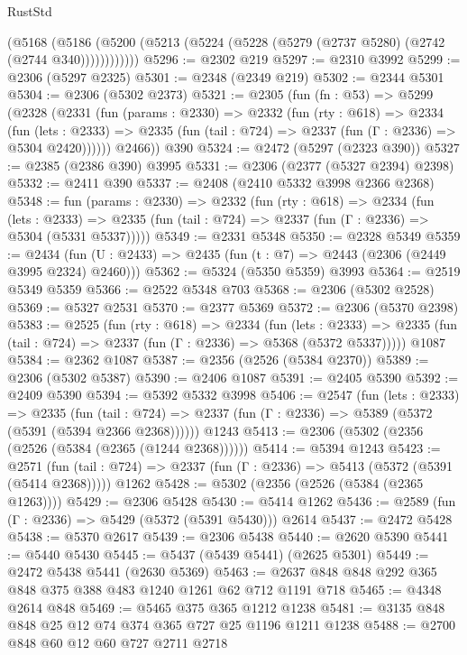 \begin{lexlean}{RustStd}
\begin{coremodule}
          (@5168
            (@5186 (@5200 (@5213 (@5224 (@5228 (@5279 (@2737 @5280) (@2742 (@2744 @340))))))))))))
@5296 := @2302 @219
@5297 := @2310 @3992
@5299 := @2306 (@5297 @2325)
@5301 := @2348 (@2349 @219)
@5302 := @2344 @5301
@5304 := @2306 (@5302 @2373)
@5321 := @2305
    (fun (fn : @53) =>
    @5299
      (@2328
        (@2331
          (fun (params : @2330) =>
          @2332
            (fun (rty : @618) =>
            @2334
              (fun (lets : @2333) =>
              @2335 (fun (tail : @724) => @2337 (fun (Γ : @2336) => @5304 @2420))))))
        @2466))
    @390
@5324 := @2472 (@5297 (@2323 @390))
@5327 := @2385 (@2386 @390) @3995
@5331 := @2306 (@2377 (@5327 @2394) @2398)
@5332 := @2411 @390
@5337 := @2408 (@2410 @5332 @3998 @2366 @2368)
@5348 := fun (params : @2330) =>
  @2332
    (fun (rty : @618) =>
    @2334
      (fun (lets : @2333) =>
      @2335 (fun (tail : @724) => @2337 (fun (Γ : @2336) => @5304 (@5331 @5337)))))
@5349 := @2331 @5348
@5350 := @2328 @5349
@5359 := @2434 (fun (U : @2433) => @2435 (fun (t : @7) => @2443 (@2306 (@2449 @3995 @2324) @2460)))
@5362 := @5324 (@5350 @5359) @3993
@5364 := @2519 @5349 @5359
@5366 := @2522 @5348 @703
@5368 := @2306 (@5302 @2528)
@5369 := @5327 @2531
@5370 := @2377 @5369
@5372 := @2306 (@5370 @2398)
@5383 := @2525
    (fun (rty : @618) =>
    @2334
      (fun (lets : @2333) =>
      @2335 (fun (tail : @724) => @2337 (fun (Γ : @2336) => @5368 (@5372 @5337)))))
    @1087
@5384 := @2362 @1087
@5387 := @2356 (@2526 (@5384 @2370))
@5389 := @2306 (@5302 @5387)
@5390 := @2406 @1087
@5391 := @2405 @5390
@5392 := @2409 @5390
@5394 := @5392 @5332 @3998
@5406 := @2547
    (fun (lets : @2333) =>
    @2335
      (fun (tail : @724) => @2337 (fun (Γ : @2336) => @5389 (@5372 (@5391 (@5394 @2366 @2368))))))
    @1243
@5413 := @2306 (@5302 (@2356 (@2526 (@5384 (@2365 (@1244 @2368))))))
@5414 := @5394 @1243
@5423 := @2571
    (fun (tail : @724) => @2337 (fun (Γ : @2336) => @5413 (@5372 (@5391 (@5414 @2368)))))
    @1262
@5428 := @5302 (@2356 (@2526 (@5384 (@2365 @1263))))
@5429 := @2306 @5428
@5430 := @5414 @1262
@5436 := @2589 (fun (Γ : @2336) => @5429 (@5372 (@5391 @5430))) @2614
@5437 := @2472 @5428
@5438 := @5370 @2617
@5439 := @2306 @5438
@5440 := @2620 @5390
@5441 := @5440 @5430
@5445 := @5437 (@5439 @5441) (@2625 @5301)
@5449 := @2472 @5438 @5441 (@2630 @5369)
@5463 := @2637 @848 @848 @292 @365 @848 @375 @388 @483 @1240 @1261 @62 @712 @1191 @718
@5465 := @4348 @2614 @848
@5469 := @5465 @375 @365 @1212 @1238
@5481 := @3135 @848 @848 @25 @12 @74 @374 @365 @727 @25 @1196 @1211 @1238
@5488 := @2700 @848 @60 @12 @60 @727 @2711 @2718

\end{coremodule}
\end{lexlean}
